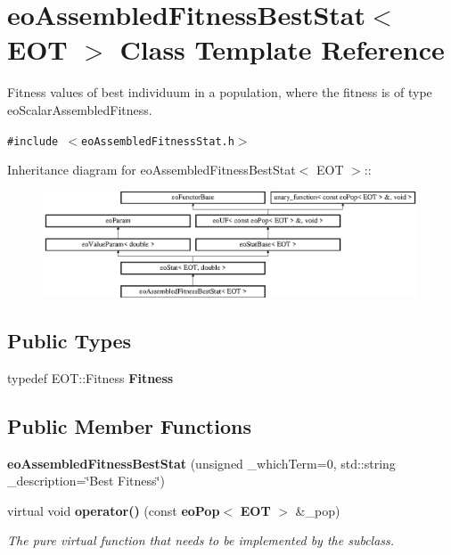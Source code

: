 \section{eo\-Assembled\-Fitness\-Best\-Stat$<$ EOT $>$ Class Template Reference}
\label{classeo_assembled_fitness_best_stat}
Fitness values of best individuum in a population, where the fitness is of type eo\-Scalar\-Assembled\-Fitness.  


{\tt \#include $<$eo\-Assembled\-Fitness\-Stat.h$>$}

Inheritance diagram for eo\-Assembled\-Fitness\-Best\-Stat$<$ EOT $>$::\begin{figure}[H]
\begin{center}
\leavevmode
\includegraphics[height=3.15315cm]{classeo_assembled_fitness_best_stat}
\end{center}
\end{figure}
\subsection*{Public Types}
\begin{CompactItemize}
\item 
typedef EOT::Fitness {\bf Fitness}\label{classeo_assembled_fitness_best_stat_w0}

\end{CompactItemize}
\subsection*{Public Member Functions}
\begin{CompactItemize}
\item 
{\bf eo\-Assembled\-Fitness\-Best\-Stat} (unsigned \_\-which\-Term=0, std::string \_\-description=\char`\"{}Best Fitness\char`\"{})\label{classeo_assembled_fitness_best_stat_a0}

\item 
virtual void {\bf operator()} (const {\bf eo\-Pop}$<$ {\bf EOT} $>$ \&\_\-pop)\label{classeo_assembled_fitness_best_stat_a1}

\begin{CompactList}\small\item\em The pure virtual function that needs to be implemented by the subclass. \item\end{CompactList}\end{CompactItemize}
